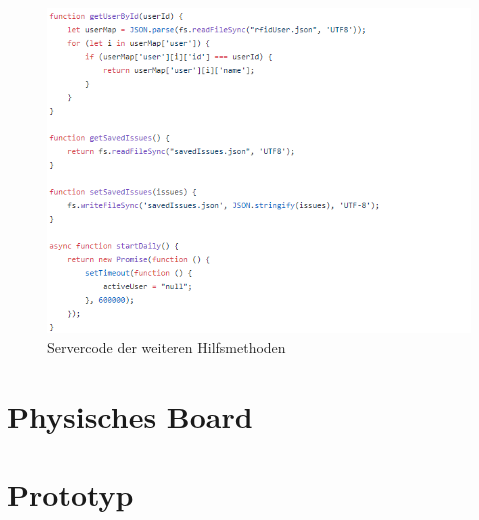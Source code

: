 \documentclass[12pt,titlepage]{scrartcl}
\begin{document}
\begin{appendix}
\begin{figure}[H]
    			\includegraphics[height=0.65\textheight]{serverHelper}
  				\caption{Servercode der weiteren Hilfsmethoden}
  				\label{fig:ANHServerHelper}
			\end{figure}
		\newpage 	  	
 	  	\section{Physisches Board} \label{ANHPhysischesBoard}
		\newpage 	  	
 	  	\section{Prototyp} \label{ANHPrototyp}
 	\end{appendix}
 	
 	\newpage

 	
 	
\end{document}
